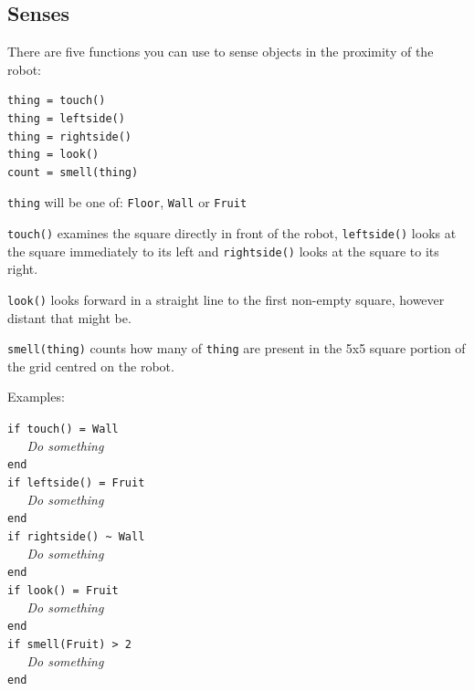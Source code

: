 \documentclass[12pt,a4paper,twoside]{article}
\renewcommand{\_}{\texttt{\symbol{95}}}
\begin{document}
\subsection{Senses}

There are five functions you can use to sense objects in the proximity
of the robot:

\begin{verbatim}
thing = touch()
thing = leftside()
thing = rightside()
thing = look()
count = smell(thing)
\end{verbatim}

\begin{bulletlist}
\item \texttt{thing} will be one of:
	\texttt{Floor}, \texttt{Wall} or \texttt{Fruit}

\item \texttt{touch()} examines the square directly in front of the
	robot, \texttt{leftside()} looks at the square immediately to its
	left and \texttt{rightside()} looks at the square to its right.

\item \texttt{look()} looks forward in a straight line to the first
	non-empty square, however distant that might be.

\item \texttt{smell(thing)} counts how many of \texttt{thing} are present
	in the 5x5 square portion of the grid centred on the robot.
\end{bulletlist}

Examples:

\verb^if touch() = Wall^\\
\verb^   ^\textit{Do something}\\
\verb^end^\\
\verb^if leftside() = Fruit^\\
\verb^   ^\textit{Do something}\\
\verb^end^\\
\verb^if rightside() ~ Wall^\\
\verb^   ^\textit{Do something}\\
\verb^end^\\
\verb^if look() = Fruit^\\
\verb^   ^\textit{Do something}\\
\verb^end^\\
\verb^if smell(Fruit) > 2^\\
\verb^   ^\textit{Do something}\\
\verb^end^\\
\end{document}
